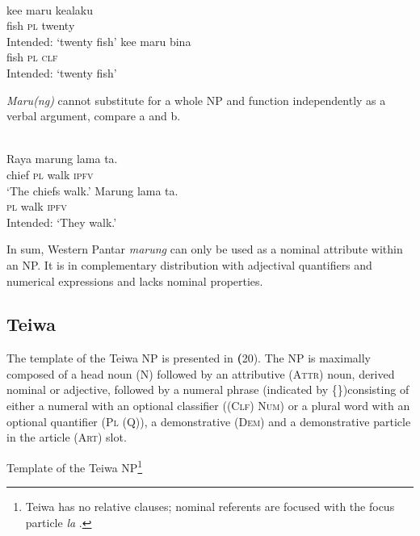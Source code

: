 \ea%
\label{ex:9:18}
 \\
\ea
\gll *ke{\textglotstop}e  maru kealaku \\
   fish  \textsc{pl} twenty \\
\glt Intended: `twenty fish'
\ex 
\gll *ke{\textglotstop}e maru  bina \\
 fish \textsc{pl} \textsc{clf} \\
 \glt Intended: `twenty fish'
\z
\z

\textit{Maru(ng)} cannot substitute for a whole NP and function independently as a verbal argument, compare a and b.


\ea%
\label{ex:9:19}
 \\
\ea
\gll  Raya marung lama ta. \\
   chief \textsc{pl} walk \textsc{ipfv}  \\
\glt `The chiefs walk.'
\ex
\gll *Marung lama ta. \\
  \textsc{pl} walk \textsc{ipfv}  \\
\glt Intended: `They walk.'
\z
\z


 In sum, Western Pantar \textit{marung} can only be used as a nominal attribute within an NP. It is in complementary distribution with adjectival quantifiers and numerical expressions and lacks nominal properties.

\subsection{Teiwa} %
\label{sec:9:3.2}
The template of the Teiwa NP is presented in \textbf{(}20). The NP is maximally composed of a head noun (N) followed by an attributive (\textsc{Attr)} noun, derived nominal or adjective\textsc{,} followed by a numeral phrase (indicated by \{\})consisting of either a numeral with an optional classifier (\textsc{(Clf)} \textsc{Num)} or a plural word with an optional quantifier (\textsc{Pl} \textsc{(Q)),} a demonstrative \textsc{(Dem)} and a demonstrative particle in the article (\textsc{Art)} slot.

\ea%
\label{ex:9:20}

 Template of the Teiwa NP\footnote{Teiwa has no relative clauses; nominal referents are focused with the focus particle \textit{la} \citep{Klamer2010}.}

